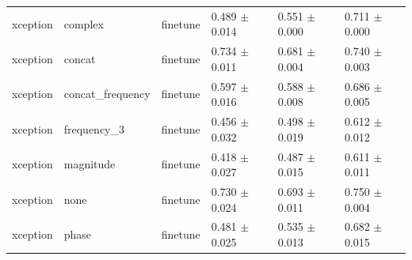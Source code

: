 \begin{table}
\begin{tabular}{llllll}
xception & complex & finetune & 0.489 $\pm$ 0.014 & 0.551 $\pm$ 0.000 & 0.711 $\pm$ 0.000 \\
xception & concat & finetune & 0.734 $\pm$ 0.011 & 0.681 $\pm$ 0.004 & 0.740 $\pm$ 0.003 \\
xception & concat_frequency & finetune & 0.597 $\pm$ 0.016 & 0.588 $\pm$ 0.008 & 0.686 $\pm$ 0.005 \\
xception & frequency_3 & finetune & 0.456 $\pm$ 0.032 & 0.498 $\pm$ 0.019 & 0.612 $\pm$ 0.012 \\
xception & magnitude & finetune & 0.418 $\pm$ 0.027 & 0.487 $\pm$ 0.015 & 0.611 $\pm$ 0.011 \\
xception & none & finetune & 0.730 $\pm$ 0.024 & 0.693 $\pm$ 0.011 & 0.750 $\pm$ 0.004 \\
xception & phase & finetune & 0.481 $\pm$ 0.025 & 0.535 $\pm$ 0.013 & 0.682 $\pm$ 0.015 \\
\bottomrule
\end{tabular}
\end{table}
